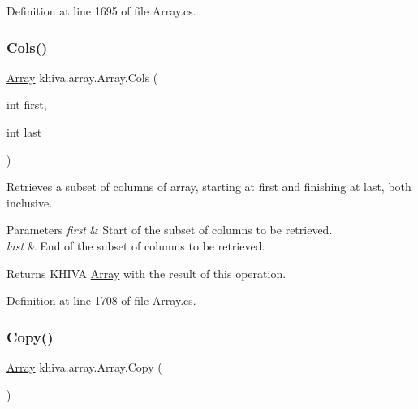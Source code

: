 Definition at line 1695 of file Array.\+cs.

\mbox{\label{classkhiva_1_1array_1_1_array_a873de346b0e3e7972d25f9206dc98679}} 
\subsubsection{\texorpdfstring{Cols()}{Cols()}}
{\footnotesize\ttfamily \mbox{\hyperlink{classkhiva_1_1array_1_1_array}{Array}} khiva.\+array.\+Array.\+Cols (\begin{DoxyParamCaption}\item[{int}]{first,  }\item[{int}]{last }\end{DoxyParamCaption})\hspace{0.3cm}{\ttfamily [inline]}}



Retrieves a subset of columns of array, starting at first and finishing at last, both inclusive. 


\begin{DoxyParams}{Parameters}
{\em first} & Start of the subset of columns to be retrieved.\\
\hline
{\em last} & End of the subset of columns to be retrieved.\\
\hline
\end{DoxyParams}
\begin{DoxyReturn}{Returns}
K\+H\+I\+VA \mbox{\hyperlink{classkhiva_1_1array_1_1_array}{Array}} with the result of this operation.
\end{DoxyReturn}


Definition at line 1708 of file Array.\+cs.

\mbox{\label{classkhiva_1_1array_1_1_array_a2e7db9e6ce44e8e1f5e4a44552150847}} 
\subsubsection{\texorpdfstring{Copy()}{Copy()}}
{\footnotesize\ttfamily \mbox{\hyperlink{classkhiva_1_1array_1_1_array}{Array}} khiva.\+array.\+Array.\+Copy (\begin{DoxyParamCaption}{ }\end{DoxyParamCaption})\hspace{0.3cm}{\ttfamily [inline]}}



